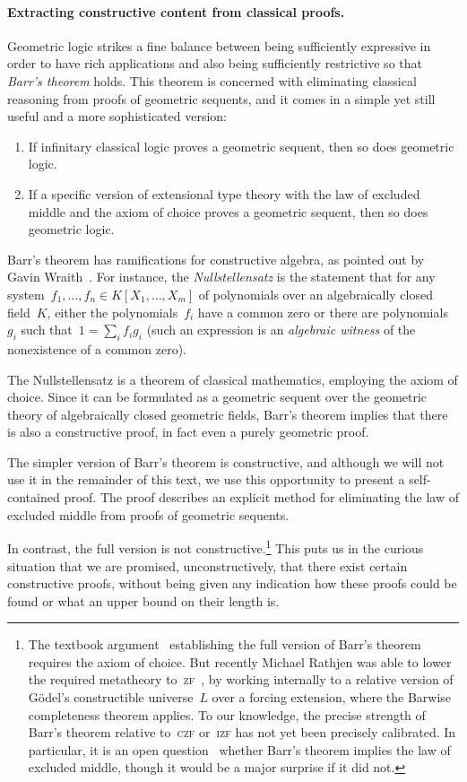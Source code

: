 \documentclass{ws-rv9x6}
\renewcommand{\_}{\mathpunct{.}}
\newcommand{\?}{\,{:}\,}
\begin{document}
\paragraph{Extracting constructive content from classical proofs.}\label{par:barr}
Geometric logic strikes a fine balance between being sufficiently expressive in order to
have rich applications and also being sufficiently restrictive so that \emph{Barr's
theorem} holds. This theorem is concerned with eliminating classical reasoning
from proofs of geometric sequents, and it comes in a simple yet still useful
and a more sophisticated version:
\begin{enumerate}
\item If infinitary classical logic proves a geometric sequent, then so does
geometric logic.
\item If a specific version of extensional type theory with the law of excluded
middle and the axiom of choice proves a geometric sequent, then so does
geometric logic.
\end{enumerate}
Barr's theorem has ramifications for constructive algebra, as pointed out by
Gavin Wraith~\cite{wraith:intuitionistic-algebra}.
For instance, the \emph{Nullstellensatz} is the statement that for any
system~$f_1,\ldots,f_n \in K[X_1,\ldots,X_m]$ of polynomials over an
algebraically closed field~$K$, either the polynomials~$f_i$ have a common zero
or there are polynomials~$g_i$ such that~$1 = \sum_i f_i g_i$ (such an
expression is an \emph{algebraic witness} of the nonexistence of a common
zero).

The Nullstellensatz is a theorem of classical mathematics, employing the
axiom of choice. Since it can be formulated as a geometric sequent over the
geometric theory of algebraically closed geometric fields, Barr's theorem
implies that there is also a constructive proof, in fact even a purely
geometric proof.

The simpler version of Barr's theorem is constructive, and although we will not
use it in the remainder of this text, we use this opportunity to present a
self-contained proof. The proof describes an explicit method for eliminating
the law of excluded middle from proofs of geometric sequents.

In contrast, the full version is not constructive.\footnote{%
The textbook argument~\cite[Theorem~7.57]{johnstone:topos-theory} establishing
the full version of Barr's theorem requires the axiom of choice. But recently
Michael Rathjen was able to lower the required metatheory
to~\textsc{zf}~\cite[Remark~4.2]{rathjen:barr}, by working internally to a
relative version of Gödel's constructible universe~$L$ over a forcing
extension, where the Barwise completeness theorem applies. To our knowledge,
the precise strength of Barr's theorem relative to~\textsc{czf} or~\textsc{izf}
has not yet been precisely calibrated. In particular, it is an open
question~\cite{henry:question-barr} whether Barr's theorem implies the law of
excluded middle, though it would be a major surprise if it did not.}
This puts us in the curious situation that we are promised, unconstructively,
that there exist certain constructive proofs, without being given any indication how
these proofs could be found or what an upper bound on their length is.
\end{document}
